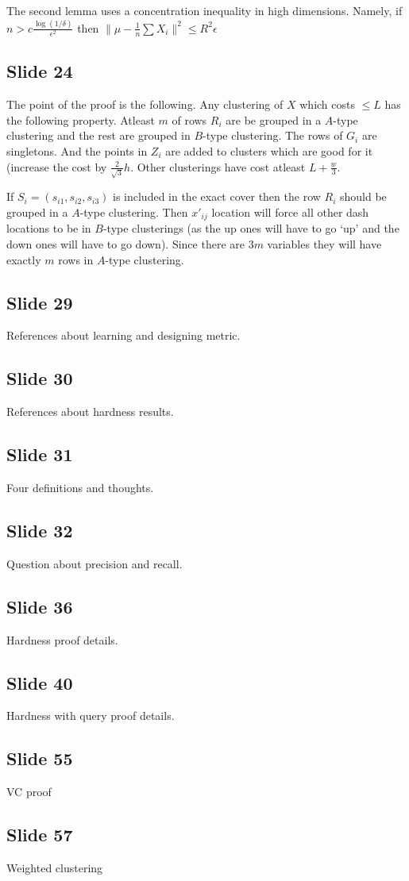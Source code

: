 \documentclass[12pt]{article}
\begin{document}
The second lemma uses a concentration inequality in high dimensions. Namely, if $n > c\frac{\log (1/\delta)}{\epsilon^2}$ then $\|\mu - \frac{1}{n}\sum X_i\|^2 \le R^2 \epsilon$ 

\subsection*{Slide 24}
The point of the proof is the following. Any clustering of $X$ which costs $\le L$ has the following property. Atleast $m$ of rows $R_i$ are be grouped in a $A$-type clustering and the rest are grouped in $B$-type clustering. The rows of $G_i$ are singletons. And the points in $Z_i$ are added to clusters which are good for it (increase the cost by $\frac{2}{\sqrt{3}}h$. Other clusterings have cost atleast $L + \frac{w}{3}$. 

If $S_i = (s_{i1}, s_{i2}, s_{i3})$ is included in the exact cover then the row $R_i$ should be grouped in a $A$-type clustering. Then $x'_{ij}$ location will force all other dash locations to be in $B$-type clusterings (as the up ones will have to go `up' and the down ones will have to go down). Since there are $3m$ variables they will have exactly $m$ rows in $A$-type clustering. 

\subsection*{Slide 29}
References about learning and designing metric.

\subsection*{Slide 30}
References about hardness results.

\subsection*{Slide 31}
Four definitions and thoughts.

\subsection*{Slide 32}
Question about precision and recall.

\subsection*{Slide 36}
Hardness proof details.

\subsection*{Slide 40}
Hardness with query proof details.

\subsection*{Slide 55}
VC proof


\subsection*{Slide 57}
Weighted clustering
\end{document}
